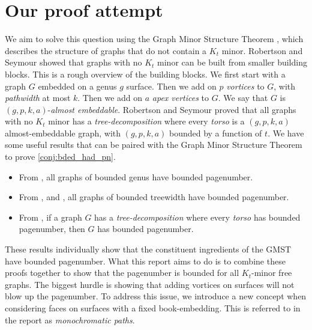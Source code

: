 \section{Our proof attempt}
We aim to solve this question using the Graph Minor Structure Theorem \cite{robertsonGraphMinorsXVI2003}, which describes the structure of graphs that do not contain a \(K_t\) minor.
Robertson and Seymour showed that graphs with no \(K_t\) minor can be built from smaller building blocks. This is a rough overview of the building blocks. We first start with a graph \(G\) embedded on a genus \(g\) surface. Then we add on \(p\) \textit{vortices} to \(G\), with \textit{pathwidth} at most \(k\). Then we add on \(a\) \textit{apex vertices} to \(G\). We say that \(G\) is \((g, p, k, a)\)-\textit{almost embeddable}. Robertson and Seymour \cite{robertsonGraphMinorsXVI2003} proved that all graphs with no \(K_t\) minor has a \textit{tree-decomposition} where every \textit{torso} is a \((g, p, k, a)\) almost-embeddable graph, with \((g, p, k, a)\) bounded by a function of \(t\).
We have some useful results that can be paired with the Graph Minor Structure Theorem to prove \cref{conj:bded_had_pn}.
\begin{itemize}
	\item From \textcite{heathPagenumberGenusGraphs1992}, all graphs of bounded genus have bounded pagenumber.
	\item From \textcite{ganleyPagenumberTrees2001}, and \textcite{dujmovicGraphTreewidthGeometric2007}, all graphs of bounded treewidth have bounded pagenumber.
	\item From \textcite{hickingbothamStackNumberCliqueSum2023}, if a graph \(G\) has a \textit{tree-decomposition} where every \textit{torso} has bounded pagenumber, then \(G\) has bounded pagenumber.
\end{itemize}
These results individually show that the constituent ingredients of the GMST have bounded pagenumber. What this report aims to do is to combine these proofs together to show that the pagenumber is bounded for all $K_t$-minor free graphs.
The biggest hurdle is showing that adding vortices on surfaces will not blow up the pagenumber. To address this issue, we introduce a new concept when considering faces on surfaces with a fixed book-embedding. This is referred to in the report as \textit{monochromatic paths}.
